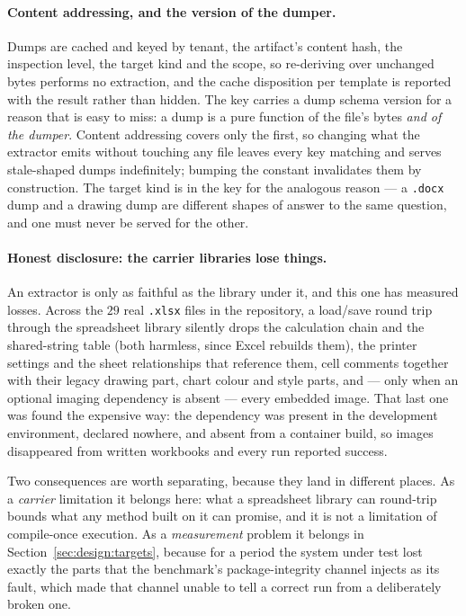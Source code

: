 \paragraph{Content addressing, and the version of the dumper.}
Dumps are cached and keyed by tenant, the artifact's content hash, the inspection level, the
target kind and the scope, so re-deriving over unchanged bytes performs no extraction, and
the cache disposition per template is reported with the result rather than hidden. The key
carries a dump schema version for a reason that is easy to miss: a dump is a pure function
of the file's bytes \emph{and of the dumper}. Content addressing covers only the first, so
changing what the extractor emits without touching any file leaves every key matching and
serves stale-shaped dumps indefinitely; bumping the constant invalidates them by
construction. The target kind is in the key for the analogous reason --- a \texttt{.docx} dump
and a drawing dump are different shapes of answer to the same question, and one must never be
served for the other.

\paragraph{Honest disclosure: the carrier libraries lose things.}
An extractor is only as faithful as the library under it, and this one has measured losses.
Across the $29$ real \texttt{.xlsx} files in the repository, a load/save round trip through
the spreadsheet library silently drops the calculation chain and the shared-string table
(both harmless, since Excel rebuilds them), the printer settings and the sheet relationships
that reference them, cell comments together with their legacy drawing part, chart colour and
style parts, and --- only when an optional imaging dependency is absent --- every embedded
image. That last one was found the expensive way: the dependency was present in the
development environment, declared nowhere, and absent from a container build, so images
disappeared from written workbooks and every run reported success.

Two consequences are worth separating, because they land in different places. As a
\emph{carrier} limitation it belongs here: what a spreadsheet library can round-trip bounds
what any method built on it can promise, and it is not a limitation of compile-once
execution. As a \emph{measurement} problem it belongs in
Section~\ref{sec:design:targets}, because for a period the system under test lost exactly the
parts that the benchmark's package-integrity channel injects as its fault, which made that
channel unable to tell a correct run from a deliberately broken one.

